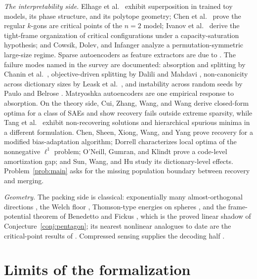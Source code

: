 \documentclass[11pt]{amsart}
\theoremstyle{plain}
\theoremstyle{definition}
\begin{document}
\emph{The interpretability side.} Elhage et al.~\cite{elhage2022} exhibit superposition in trained toy models, its phase structure, and its polytope geometry; Chen et al.~\cite{chen2023} prove the regular $k$-gons are critical points of the $n=2$ model; Ivanov et al.~\cite{ivanov2026} derive the tight-frame organization of critical configurations under a capacity-saturation hypothesis; and Cowsik, Dolev, and Infanger \cite{cowsik2024} analyze a permutation-symmetric large-size regime. Sparse autoencoders as feature extractors are due to \cite{bricken2023,cunningham2023}. The failure modes named in the survey are documented: absorption and splitting by Chanin et al.~\cite{chanin2024}, objective-driven splitting by Dalili and Mahdavi \cite{dalili2026}, non-canonicity across dictionary sizes by Leask et al.~\cite{leask2025}, and instability across random seeds by Paulo and Belrose \cite{paulo2025}. Matryoshka autoencoders \cite{bussmann2025} are one empirical response to absorption. On the theory side, Cui, Zhang, Wang, and Wang \cite{cui2025} derive closed-form optima for a class of SAEs and show recovery fails outside extreme sparsity, while Tang et al.~\cite{tang2025} exhibit non-recovering solutions and hierarchical spurious minima in a different formulation. Chen, Sheen, Xiong, Wang, and Yang \cite{chen2025} prove recovery for a modified bias-adaptation algorithm; Dorrell \cite{dorrell2026} characterizes local optima of the nonnegative $\ell^1$ problem; O'Neill, Gumran, and Klindt \cite{oneill2024} prove a code-level amortization gap; and Sun, Wang, and Hu \cite{sunwanghu2026} study its dictionary-level effects. Problem~\ref{prob:main} asks for the missing population boundary between recovery and merging.

\emph{Geometry.} The packing side is classical: exponentially many almost-orthogonal directions \cite{johnson1984}, the Welch floor \cite{welch1974}, Thomson-type energies on spheres \cite{saff1997}, and the frame-potential theorem of Benedetto and Fickus \cite{benedetto2003}, which is the proved linear shadow of Conjecture~\ref{conj:pentagon}; its nearest nonlinear analogues to date are the critical-point results of \cite{chen2023,ivanov2026}. Compressed sensing supplies the decoding half \cite{candes2006,donoho2006,candes2008,caizhang2014}.

\section{Limits of the formalization}\label{sec:obstructions}
\end{document}
